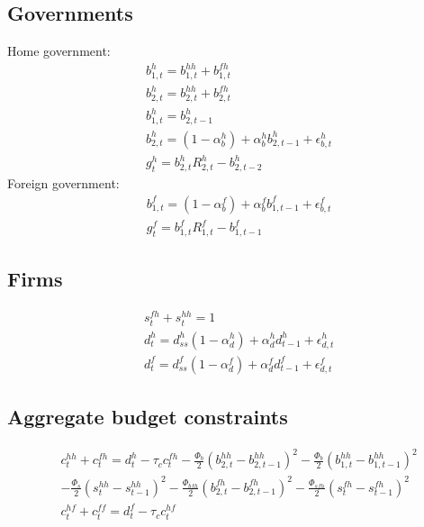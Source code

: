 \documentclass[a4paper]{article}
\begin{document}
\subsection{Governments}
Home government:
\begin{align}
&b^h_{1,t} = b^{hh}_{1,t} + b^{fh}_{1,t}\\
&b^h_{2,t} = b^{hh}_{2,t} + b^{fh}_{2,t}\\
&b^h_{1,t} = b^h_{2,t-1}\\
&b^h_{2,t} = (1-\alpha^h_{b})+\alpha^h_{b} b^h_{2,t-1}+\epsilon^h_{b,t}\\
&g^h_t	   = b^h_{2,t}R^h_{2,t}-b^h_{2,t-2}
\end{align}
Foreign government:
\begin{align}
&b^f_{1,t} = (1-\alpha^f_b) + \alpha^f_b b^f_{1,t-1}+\epsilon^f_{b,t}\\
&g^f_t 	= b^f_{1,t} R^f_{1,t}-b^f_{1,t-1}
\end{align}


\subsection{Firms}
\begin{align}
&s^{fh}_t+s^{hh}_t=1\\
&d^h_t=d^h_{ss} (1-\alpha^h_d) +\alpha^h_d d^h_{t-1} + \epsilon^h_{d,t}\\
&d^f_t=d^f_{ss} (1-\alpha^f_d) +\alpha^f_d d^f_{t-1} + \epsilon^f_{d,t}
\end{align}

\subsection{Aggregate budget constraints}
\begin{align}
&c^{hh}_t+c^{fh}_t=d^h_t - \tau_c c^{fh}_t -\frac{\Phi_b}{2}(b^{hh}_{2,t}-b^{hh}_{2,t-1})^2 - \frac{\Phi_b}{2}(b^{hh}_{1,t}-b^{hh}_{1,t-1})^2\\ \nonumber &-\frac{\Phi_s}{2}(s^{hh}_t-s^{hh}_{t-1})^2 - \frac{\Phi_{bfh}}{2}(b^{fh}_{2,t}-b^{fh}_{2,t-1})^2 -\frac{\Phi_{sfh}}{2}(s^{fh}_t-s^{fh}_{t-1})^2\\
&c^{hf}_t + c^{ff}_t = d^f_t - \tau_c c^{hf}_t
\end{align}
\end{document}
